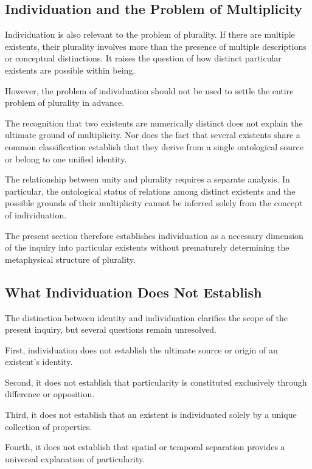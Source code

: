 \subsection{Individuation and the Problem of Multiplicity}

Individuation is also relevant to the problem of plurality. If there are multiple existents, their plurality involves more than the presence of multiple descriptions or conceptual distinctions. It raises the question of how distinct particular existents are possible within being.

However, the problem of individuation should not be used to settle the entire problem of plurality in advance.

The recognition that two existents are numerically distinct does not explain the ultimate ground of multiplicity. Nor does the fact that several existents share a common classification establish that they derive from a single ontological source or belong to one unified identity.

The relationship between unity and plurality requires a separate analysis. In particular, the ontological status of relations among distinct existents and the possible grounds of their multiplicity cannot be inferred solely from the concept of individuation.

The present section therefore establishes individuation as a necessary dimension of the inquiry into particular existents without prematurely determining the metaphysical structure of plurality.

\subsection{What Individuation Does Not Establish}

The distinction between identity and individuation clarifies the scope of the present inquiry, but several questions remain unresolved.

First, individuation does not establish the ultimate source or origin of an existent's identity.

Second, it does not establish that particularity is constituted exclusively through difference or opposition.

Third, it does not establish that an existent is individuated solely by a unique collection of properties.

Fourth, it does not establish that spatial or temporal separation provides a universal explanation of particularity.

